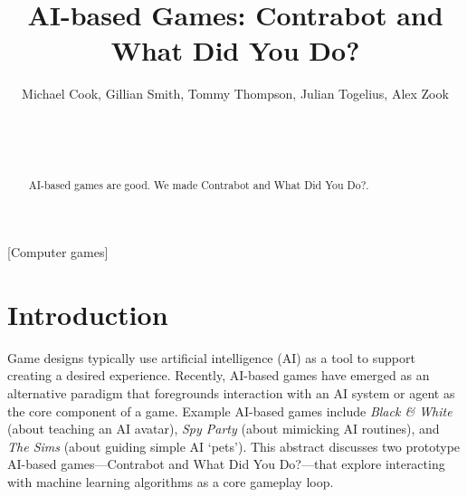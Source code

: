 \documentclass{sig-alternate}
\begin{document}

\title{AI-based Games: Contrabot and What Did You Do?}


\author{
\alignauthor
Michael Cook, Gillian Smith, Tommy Thompson, Julian Togelius, Alex Zook\\
\\
\\
\\
}

\toappear{}

\maketitle
\begin{abstract}
AI-based games are good.
We made {\sc Contrabot} and {\sc What Did You Do?}.
\end{abstract}

[Computer games]




\section{Introduction}

\noindent Game designs typically use artificial intelligence (AI) as a tool to support creating a desired experience.
Recently, AI-based games have emerged as an alternative paradigm that foregrounds interaction with an AI system or agent as the core component of a game.
Example AI-based games include {\it Black \& White} (about teaching an AI avatar), {\it Spy Party} (about mimicking AI routines), and {\it The Sims} (about guiding simple AI `pets').
This abstract discusses two prototype AI-based games---{\sc Contrabot} and {\sc What Did You Do?}---that explore interacting with machine learning algorithms as a core gameplay loop.
\end{document}
